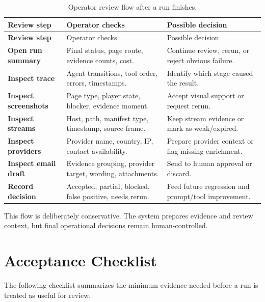 \begin{longtable}{>{\raggedright\arraybackslash\bfseries}p{3.5cm}
                  >{\raggedright\arraybackslash}p{4.8cm}
                  >{\raggedright\arraybackslash}p{5.5cm}}
\caption{Operator review flow after a run finishes.}
\label{tab:operator-review-flow}\\
\toprule
\rowcolor{accent!8}
Review step & Operator checks & Possible decision \\
\midrule
\endfirsthead
\toprule
\rowcolor{accent!8}
Review step & Operator checks & Possible decision \\
\midrule
\endhead
\bottomrule
\endfoot
Open run summary & Final status, page route, evidence counts, cost. & Continue
review, rerun, or reject obvious failure. \\
Inspect trace & Agent transitions, tool order, errors, timestamps. & Identify
which stage caused the result. \\
Inspect screenshots & Page type, player state, blocker, evidence moment. &
Accept visual support or request rerun. \\
Inspect streams & Host, path, manifest type, timestamp, source frame. & Keep
stream evidence or mark as weak/expired. \\
Inspect providers & Provider name, country, IP, contact availability. & Prepare
provider context or flag missing enrichment. \\
Inspect email draft & Evidence grouping, provider target, wording, attachments. &
Send to human approval or discard. \\
Record decision & Accepted, partial, blocked, false positive, needs rerun. &
Feed future regression and prompt/tool improvement. \\
\end{longtable}

This flow is deliberately conservative. The system prepares evidence and review
context, but final operational decisions remain human-controlled.

\section{Acceptance Checklist}

The following checklist summarizes the minimum evidence needed before a run is
treated as useful for review.

